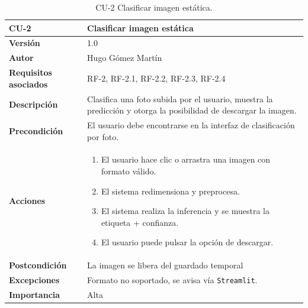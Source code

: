 \begin{table}[p]
	\centering
	\begin{tabularx}{\linewidth}{ p{} p{} }
		\toprule
		\textbf{CU-2}    & \textbf{Clasificar imagen estática}\\
		\toprule
		\textbf{Versión}              & 1.0    \\
		\textbf{Autor}                & Hugo Gómez Martín \\
		\textbf{Requisitos asociados} & RF-2, RF-2.1, RF-2.2, RF-2.3, RF-2.4 \\
		\textbf{Descripción}          & Clasifica una foto subida por el usuario, muestra la predicción y otorga la posibilidad de descargar la imagen. \\
		\textbf{Precondición}         & El usuario debe encontrarse en la interfaz de clasificación por foto. \\
		\textbf{Acciones}             &
		\begin{enumerate}
			\def\labelenumi{\arabic{enumi}.}
			\tightlist
			\item El usuario hace clic o arrastra una imagen con formato válido.
			\item El sistema redimensiona y preprocesa.
                \item El sistema realiza la inferencia y se muestra la etiqueta + confianza.
                \item El usuario puede pulsar la opción de descargar.
		\end{enumerate}\\
		\textbf{Postcondición}        & La imagen se libera del guardado temporal \\
		\textbf{Excepciones}          & Formato no soportado, se avisa vía \texttt{Streamlit}. \\
		\textbf{Importancia}          & Alta \\
		\bottomrule
	\end{tabularx}
	\caption{CU-2 Clasificar imagen estática.}
\end{table}

